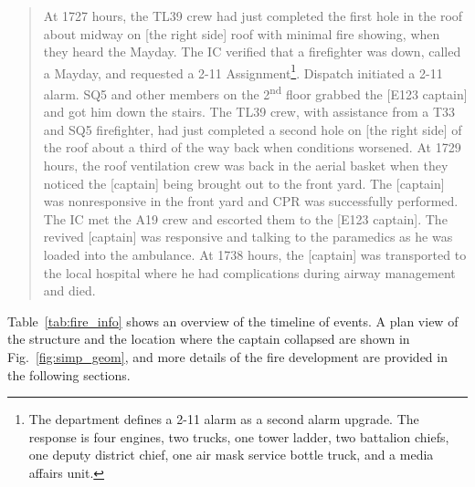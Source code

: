 \documentclass[12pt,oneside]{book}
\begin{document}
\begin{quote}
At 1727 hours, the TL39 crew had just completed the first hole in the roof about midway on [the right side] roof with minimal fire showing, when they heard the Mayday. The IC verified that a firefighter was down, called a Mayday, and requested a 2-11 Assignment\footnote{The department defines a 2-11 alarm as a second alarm upgrade. The response is four engines, two trucks, one tower ladder, two battalion chiefs, one deputy district chief, one air mask service bottle truck, and a media affairs unit.}. Dispatch initiated a 2-11 alarm. SQ5 and other members on the 2\textsuperscript{nd} floor grabbed the [E123 captain] and got him down the stairs. The TL39 crew, with assistance from a T33 and SQ5 firefighter, had just completed a second hole on [the right side] of the roof about a third of the way back when conditions worsened. At 1729 hours, the roof ventilation crew was back in the aerial basket when they noticed the [captain] being brought out to the front yard. The [captain] was nonresponsive in the front yard and CPR was successfully performed. The IC met the A19 crew and escorted them to the [E123 captain]. The revived [captain] was responsive and talking to the paramedics as he was loaded into the ambulance. At 1738 hours, the [captain] was transported to the local hospital where he had complications during airway management and died.
\end{quote}

\noindent Table~\ref{tab:fire_info} shows an overview of the timeline of events. A plan view of the structure and the location where the captain collapsed are shown in Fig.~\ref{fig:simp_geom}, and more details of the fire development are provided in the following sections.
\end{document}
